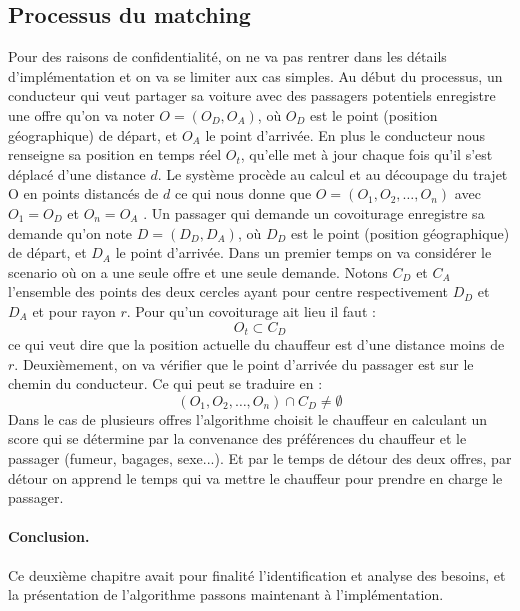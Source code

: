 \subsection{Processus du matching} %
Pour des raisons de confidentialité, on ne va pas rentrer dans les détails d'implémentation et on va se limiter aux cas simples.\cite{schreieck2016matching}\newline
Au début du processus, un conducteur qui veut partager sa voiture avec des passagers potentiels enregistre 
une offre qu'on va noter $O = (O_D, O_A)$, où $O_D$ est le point (position géographique) de départ, et $O_A$
le point d'arrivée. En plus le conducteur nous renseigne sa position en temps réel $O_t$, qu'elle met à jour chaque fois qu'il s'est déplacé d'une distance $d$. Le système procède au calcul et au découpage du trajet O en points distancés de $d$ ce qui nous donne que $O = (O_{1}, O_{2},\ldots , O_{n})$ avec $O_{1} = O_D$ et $O_{n} = O_A$ .\newline
Un passager qui demande un covoiturage enregistre sa demande qu'on note $D = (D_D, D_A)$, où $D_D$ est le point (position géographique) de départ, et $D_A$ le point d'arrivée.\newline
Dans un premier temps on va considérer le scenario où on a une seule offre et une seule demande. Notons $C_D$ et $C_A$ l'ensemble des points des deux cercles ayant pour centre respectivement $D_D$ et $D_A$ et pour rayon $r$.
Pour qu'un covoiturage ait lieu il faut : 
\begin{equation}
O_t \subset C_D 
\label{eqution1}
\end{equation}
ce qui veut dire que la position actuelle du chauffeur est d'une distance moins de $r$.
Deuxièmement, on va vérifier que le point d'arrivée du passager est sur le chemin du conducteur. Ce qui peut se traduire en :
\begin{equation}
(O_{1}, O_{2},\ldots , O_{n}) \cap C_D \ne \emptyset
\label{eqution2}
\end{equation}
Dans le cas de plusieurs offres l'algorithme choisit le chauffeur en calculant un score qui se détermine par la convenance des préférences du chauffeur et le passager (fumeur, bagages, sexe...). Et par le temps de détour des deux offres, par détour on apprend le temps qui va mettre le chauffeur pour prendre en charge le passager.
\newline
\paragraph{Conclusion.} Ce deuxième chapitre avait pour finalité l'identification et analyse des besoins, et la présentation de l'algorithme passons maintenant à l'implémentation.